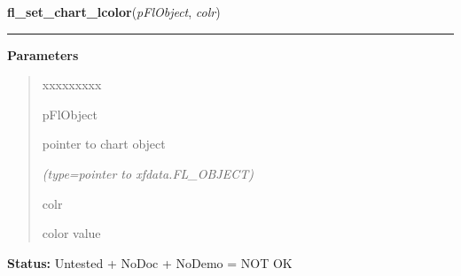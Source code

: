     \label{xformslib:flchart:fl_set_chart_lcolor}

    \vspace{0.5ex}

\hspace{.8\funcindent}\begin{boxedminipage}{\funcwidth}

    \raggedright \textbf{fl\_set\_chart\_lcolor}(\textit{pFlObject}, \textit{colr})

    \vspace{-1.5ex}

    \rule{\textwidth}{0.5\fboxrule}
\setlength{\parskip}{2ex}
\setlength{\parskip}{1ex}
      \textbf{Parameters}
      \vspace{-1ex}

      \begin{quote}
        \begin{Ventry}{xxxxxxxxx}

          \item[pFlObject]

          pointer to chart object

            {\it (type=pointer to xfdata.FL\_OBJECT)}

          \item[colr]

          color value

        \end{Ventry}

      \end{quote}

\textbf{Status:} Untested + NoDoc + NoDemo = NOT OK



    \end{boxedminipage}

    \label{xformslib:flchart:fl_set_chart_baseline}

    \vspace{0.5ex}

